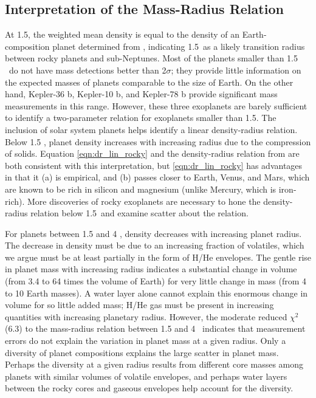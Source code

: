 \subsection{Interpretation of the Mass-Radius Relation}
At 1.5\rearth, the weighted mean density is equal to the density of an Earth-composition planet determined from \citet{Seager2007}, indicating 1.5\rearth\ as a likely transition radius between rocky planets and sub-Neptunes.  Most of the planets smaller than 1.5 \rearth\ do not have mass detections better than 2$\sigma$; they provide little information on the expected masses of planets comparable to the size of Earth.  On the other hand, Kepler-36 b, Kepler-10 b, and Kepler-78 b provide significant mass measurements in this range.  However, these three exoplanets are barely sufficient to identify a two-parameter relation for exoplanets smaller than 1.5\rearth.  The inclusion of solar system planets helps identify a linear density-radius relation.  Below 1.5 \rearth, planet density increases with increasing radius due to the compression of solids.  Equation \ref{eqn:dr_lin_rocky} and the density-radius relation from \citet{Seager2007} are both consistent with this interpretation, but \ref{eqn:dr_lin_rocky} has advantages in that it (a) is empirical, and (b) passes closer to Earth, Venus, and Mars, which are known to be rich in silicon and magnesium (unlike Mercury, which is iron-rich).  More discoveries of rocky exoplanets are necessary to hone the density-radius relation below 1.5\rearth\ and examine scatter about the relation.

For planets between 1.5 and 4 \rearth, density decreases with increasing planet radius.  The decrease in density must be due to an increasing fraction of volatiles, which we argue must be at least partially in the form of H/He envelopes.  The gentle rise in planet mass with increasing radius indicates a substantial change in volume (from 3.4 to 64 times the volume of Earth) for very little change in mass (from 4 to 10 Earth masses).  A water layer alone cannot explain this enormous change in volume for so little added mass; H/He gas must be present in increasing quantities with increasing planetary radius.  However, the moderate reduced $\chi^2$ (6.3) to the mass-radius relation between 1.5 and 4 \rearth\ indicates that measurement errors do not explain the variation in planet mass at a given radius.  Only a diversity of planet compositions explains the large scatter in planet mass.  Perhaps the diversity at a given radius results from different core masses among planets with similar volumes of volatile envelopes, and perhaps water layers between the rocky cores and gaseous envelopes help account for the diversity.


